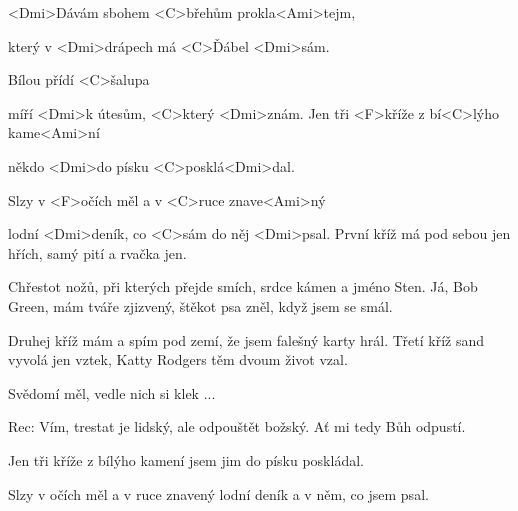 
\zs
<Dmi>Dávám sbohem <C>břehům prokla<Ami>tejm,

který v <Dmi>drápech má <C>Ďábel <Dmi>sám.

Bílou přídí <C>šalupa 

míří <Dmi>k útesům, <C>který <Dmi>znám.
\ks
\zr
Jen tři <F>kříže z bí<C>lýho kame<Ami>ní

někdo <Dmi>do písku <C>posklá<Dmi>dal.

Slzy v <F>očích měl a v <C>ruce znave<Ami>ný

lodní <Dmi>deník, co <C>sám do něj <Dmi>psal.
\kr
\zs
První kříž má pod sebou jen hřích, samý pití a rvačka jen.

Chřestot nožů, při kterých přejde smích, srdce kámen a jméno Sten.
\ks
\zr \kr
\zs
Já, Bob Green, mám tváře zjizvený, štěkot psa zněl, když jsem se smál.

Druhej kříž mám a spím pod zemí, že jsem falešný karty hrál.
\ks
\zr \kr
\zs
Třetí kříž sand vyvolá jen vztek, Katty Rodgers těm dvoum život vzal.

Svědomí měl, vedle nich si klek ...
\ks

Rec: Vím, trestat je lidský, ale odpouštět božský. Ať mi tedy Bůh odpustí.

\zr
Jen tři kříže z bílýho kamení jsem jim do písku poskládal.

Slzy v očích měl a v ruce znavený lodní deník a v něm, co jsem psal.
\kr
\kp
